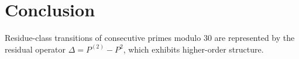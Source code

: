 \section{Conclusion}

Residue-class transitions of consecutive primes modulo $30$ are represented by the residual operator $\Delta = P^{(2)} - P^2$, which exhibits higher-order structure.